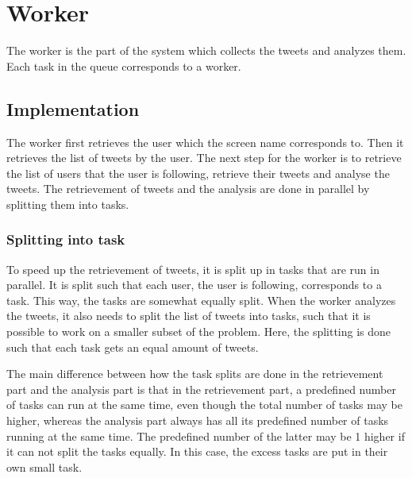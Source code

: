 \chapter{Worker}\label{workerLabel}
The worker is the part of the system which collects the tweets and analyzes
them. Each task in the queue corresponds to a worker. 

\section{Implementation}
The worker first retrieves the user which the screen name corresponds to. Then
it retrieves the list of tweets by the user. The next step for the
worker is to retrieve the list of users that the user is following, retrieve
their tweets and analyse the tweets. The retrievement of tweets and the
analysis are done in parallel by splitting them into tasks.

\subsection{Splitting into task}
To speed up the retrievement of tweets, it is split up in tasks that are run in
parallel. It is split such that each user, the user is following, corresponds
to a task. This way, the tasks are somewhat equally split. 
When the worker analyzes the tweets, it also needs to split the list of tweets
into tasks, such that it is possible to work on a smaller subset of the
problem. Here, the splitting is done such that each task gets an equal amount of
tweets.

The main difference between how the task splits are done in the retrievement
part and the analysis part is that in the retrievement part, a predefined number
of tasks can run at the same time, even though the total number of tasks may be
higher, whereas the analysis part always has all its predefined number of tasks
running at the same time. The predefined number of the latter may be 1 higher if
it can not split the tasks equally. In this case, the excess tasks are
put in their own small task.

